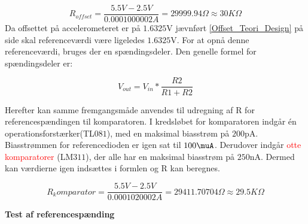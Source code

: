 \begin{equation}
R_{offset}=\frac{5.5V-2.5V}{0.0001000002A}=29999.94\Omega \approx 30K\Omega
\end{equation}  
Da offsettet på accelerometeret er på $1.6325$V jævnført \ref{Offset_Teori_Design} på side \pageref{Offset_Teori_Design} skal referenceværdi være ligeledes $1.6325$V. For at opnå denne referenceværdi, bruges der en spændingsdeler. Den genelle formel for spændingsdeler er: 

\begin{equation}
V_{out}=V_{in}*\dfrac{R2}{R1+R2}
\end{equation}

Herefter kan samme fremgangsmåde anvendes til udregning af R for referencespændingen til komparatoren. I kredsløbet for komparatoren indgår én operationsforstærker(TL$081$), med en maksimal biasstrøm på $200$pA. Biasstrømmen for referencedioden er igen sat til $100\muA$. Derudover indgår \textcolor{red}{otte komparatorer} (LM$311$), der alle har en maksimal biasstrøm på $250$nA. Dermed kan værdierne igen indsættes i formlen og R kan beregnes.

\begin{equation}
R_komparator=\frac{5.5V-2.5V}{0.0001020002A}=29411.70704\Omega \approx 29.5K\Omega 
\end{equation} 

\textbf{Test af referencespænding}


 